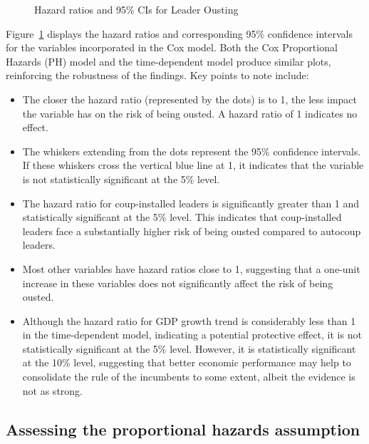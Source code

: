 \documentclass[
  12pt,
]{article}
\begin{document}
\begin{figure}
\begin{minipage}{0.50\linewidth}
{}


\end{minipage}%

\caption{\label{fig-coxHR}Hazard ratios and 95\% CIs for Leader Ousting}

\end{figure}%

Figure~\ref{fig-coxHR} displays the hazard ratios and corresponding 95\%
confidence intervals for the variables incorporated in the Cox model.
Both the Cox Proportional Hazards (PH) model and the time-dependent
model produce similar plots, reinforcing the robustness of the findings.
Key points to note include:

\begin{itemize}
\item
  The closer the hazard ratio (represented by the dots) is to 1, the
  less impact the variable has on the risk of being ousted. A hazard
  ratio of 1 indicates no effect.
\item
  The whiskers extending from the dots represent the 95\% confidence
  intervals. If these whiskers cross the vertical blue line at 1, it
  indicates that the variable is not statistically significant at the
  5\% level.
\item
  The hazard ratio for coup-installed leaders is significantly greater
  than 1 and statistically significant at the 5\% level. This indicates
  that coup-installed leaders face a substantially higher risk of being
  ousted compared to autocoup leaders.
\item
  Most other variables have hazard ratios close to 1, suggesting that a
  one-unit increase in these variables does not significantly affect the
  risk of being ousted.
\item
  Although the hazard ratio for GDP growth trend is considerably less
  than 1 in the time-dependent model, indicating a potential protective
  effect, it is not statistically significant at the 5\% level. However,
  it is statistically significant at the 10\% level, suggesting that
  better economic performance may help to consolidate the rule of the
  incumbents to some extent, albeit the evidence is not as strong.
\end{itemize}

\subsection{Assessing the proportional hazards
assumption}\label{assessing-the-proportional-hazards-assumption}
\end{document}
